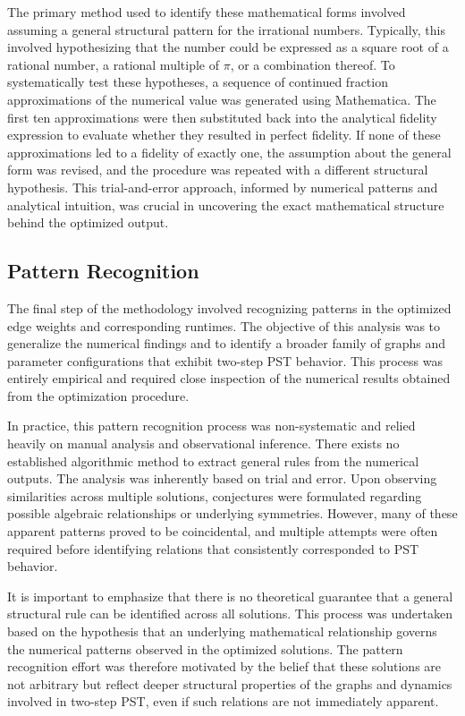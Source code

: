 \documentclass[reprint, aps, 12pt, floatfix]{revtex4-2}
\begin{document}
The primary method used to identify these mathematical forms involved assuming a general structural pattern for the irrational numbers. Typically, this involved hypothesizing that the number could be expressed as a square root of a rational number, a rational multiple of $\pi$, or a combination thereof. To systematically test these hypotheses, a sequence of continued fraction approximations of the numerical value was generated using Mathematica. The first ten approximations were then substituted back into the analytical fidelity expression to evaluate whether they resulted in perfect fidelity. If none of these approximations led to a fidelity of exactly one, the assumption about the general form was revised, and the procedure was repeated with a different structural hypothesis. This trial-and-error approach, informed by numerical patterns and analytical intuition, was crucial in uncovering the exact mathematical structure behind the optimized output.

\subsection{Pattern Recognition}
The final step of the methodology involved recognizing patterns in the optimized edge weights and corresponding runtimes. The objective of this analysis was to generalize the numerical findings and to identify a broader family of graphs and parameter configurations that exhibit two-step PST behavior. This process was entirely empirical and required close inspection of the numerical results obtained from the optimization procedure.

In practice, this pattern recognition process was non-systematic and relied heavily on manual analysis and observational inference. There exists no established algorithmic method to extract general rules from the numerical outputs. The analysis was inherently based on trial and error. Upon observing similarities across multiple solutions, conjectures were formulated regarding possible algebraic relationships or underlying symmetries. However, many of these apparent patterns proved to be coincidental, and multiple attempts were often required before identifying relations that consistently corresponded to PST behavior.

It is important to emphasize that there is no theoretical guarantee that a general structural rule can be identified across all solutions. This process was undertaken based on the hypothesis that an underlying mathematical relationship governs the numerical patterns observed in the optimized solutions. The pattern recognition effort was therefore motivated by the belief that these solutions are not arbitrary but reflect deeper structural properties of the graphs and dynamics involved in two-step PST, even if such relations are not immediately apparent.
\end{document}
